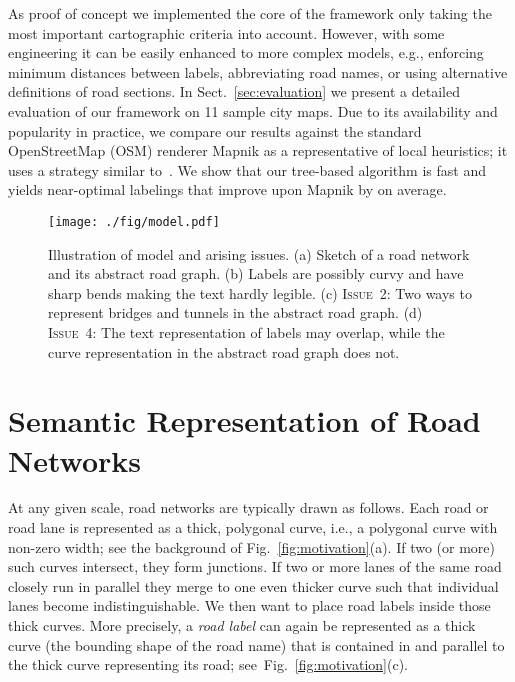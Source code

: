 \documentclass[a4paper,11pt]{article}
\newcommand{\ICrossings}{\textsc{Issue~2}\xspace}
\newcommand{\IFatLabels}{\textsc{Issue~4}\xspace}
\begin{document}
 As proof of concept we implemented the core of the framework only taking 
    the most important cartographic criteria into account. However, with
   some engineering it can be easily enhanced to more complex models,
   e.g., enforcing minimum distances between labels, abbreviating road names, or using alternative definitions of road sections.  In
 Sect.~\ref{sec:evaluation} we present a detailed evaluation of our
 framework on 11 sample city maps.  Due to its availability and
 popularity in practice, we compare our results against the standard
 OpenStreetMap (OSM) renderer Mapnik as a representative of local
 heuristics; it uses a strategy similar
 to~\cite{street-name-placement,strijk2001}. We show that our
 tree-based algorithm is fast and yields near-optimal labelings that
 improve upon Mapnik by  on average. 





\begin{figure}[htb]
\centering
\texttt{[image: ./fig/model.pdf]}
\caption{Illustration of model and arising issues. (a) Sketch of a road network and its abstract road graph.  (b) Labels are possibly curvy and have sharp bends making the text hardly legible. (c) \ICrossings: Two ways to represent bridges and tunnels in the abstract road graph. (d) \IFatLabels: The text representation of labels  may overlap, while the curve representation in the abstract road graph does not.}
\label{fig:model-issues}
\end{figure}


\section{Semantic Representation of Road Networks}\label{sec:model}




At any given scale, road networks are typically drawn as follows. Each
road or road lane is represented as a thick, polygonal curve, i.e.,
a polygonal curve with non-zero width; see the background of Fig.~\ref{fig:motivation}(a). If two (or more) such curves intersect, they form
junctions. If two or more lanes of the same road closely run in parallel they merge to one even
thicker curve such that individual lanes become indistinguishable.  We
then want to place road labels inside those thick curves. More
precisely, a \emph{road label} can again be represented as a thick
curve (the bounding shape of the road name) that is contained in and
parallel to the thick curve representing its road; see~Fig.~\ref{fig:motivation}(c).
\end{document}
